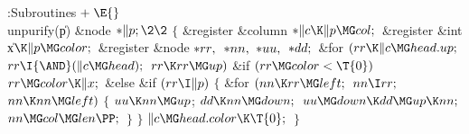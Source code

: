 \Y\B\4:Subroutines\X${}\mathrel+\E{}$\6
\\{unpurify}(\|p)\1\1\6
\&{node} ${}{*}\|p;\2\2{}$\6
${}\{{}$\5
\1\&{register} \&{column} ${}{*}\|c\K\|p\MG\\{col};{}$\6
\&{register} \&{int} \|x${}\K\|p\MG\\{color};{}$\6
\&{register} \&{node} ${}{*}\\{rr},{}$ ${}{*}\\{nn},{}$ ${}{*}\\{uu},{}$ ${}{*}%
\\{dd};{}$\7
\&{for} ${}(\\{rr}\K\|c\MG\\{head}.\\{up};{}$ ${}\\{rr}\I{\AND}(\|c\MG%
\\{head});{}$ ${}\\{rr}\K\\{rr}\MG\\{up}){}$\1\6
\&{if} ${}(\\{rr}\MG\\{color}<\T{0}){}$\1\5
${}\\{rr}\MG\\{color}\K\|x;{}$\2\6
\&{else} \&{if} ${}(\\{rr}\I\|p){}$\5
${}\{{}$\1\6
\&{for} ${}(\\{nn}\K\\{rr}\MG\\{left};{}$ ${}\\{nn}\I\\{rr};{}$ ${}\\{nn}\K%
\\{nn}\MG\\{left}){}$\5
${}\{{}$\1\6
${}\\{uu}\K\\{nn}\MG\\{up}{}$;\5
${}\\{dd}\K\\{nn}\MG\\{down};{}$\6
${}\\{uu}\MG\\{down}\K\\{dd}\MG\\{up}\K\\{nn};{}$\6
${}\\{nn}\MG\\{col}\MG\\{len}\PP;{}$\6
\4${}\}{}$\2\6
\4${}\}{}$\2\2\6
${}\|c\MG\\{head}.\\{color}\K\T{0};{}$\6
\4${}\}{}$\2\par
\fi


